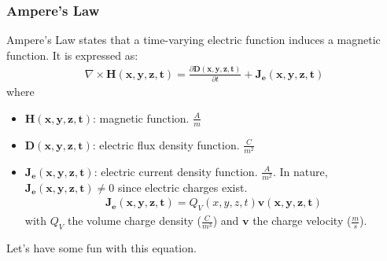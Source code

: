 \subsubsection{Ampere's Law}

Ampere's Law states that a time-varying electric function induces a magnetic
function. It is expressed as:
\begin{align*}
  \nabla \times \mathbf{H(x,y,z,t)} = \frac{\partial \mathbf{D(x,y,z,t)}}{\partial t} + \mathbf{J_e(x,y,z,t)} \tag{3}
\end{align*}
where
\begin{itemize}
  \item \( \mathbf{H(x,y,z,t)} \): magnetic function. \( \frac{A}{m} \)
  \item \( \mathbf{D(x,y,z,t)} \): electric flux density function.
    \( \frac{C}{m^2} \)
  \item \( \mathbf{J_e(x,y,z,t)} \): electric current density function.
    \( \frac{A}{m^2} \). In nature, \( \mathbf{J_e(x,y,z,t)} \neq 0 \)
    since electric charges exist.
    \begin{align*}
      \mathbf{J_e(x,y,z,t)} = Q_V(x,y,z,t) \mathbf{v(x,y,z,t)}
    \end{align*}
    with \(Q_V\) the volume charge density (\(\frac{C}{m^3}\)) and \(\mathbf{v}\) the
    charge velocity (\(\frac{m}{s}\)).
\end{itemize}
Let's have some fun with this equation.
